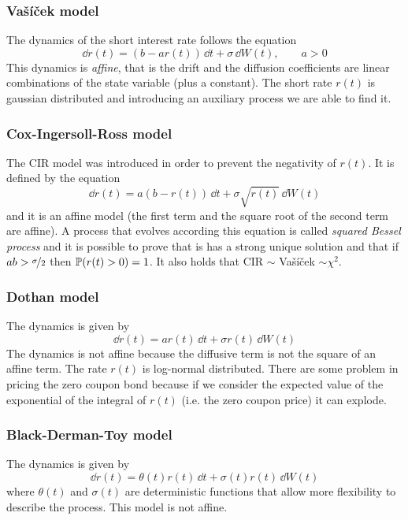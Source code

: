 \subsubsection{Vašíček model}
The dynamics of the short interest rate follows the equation
\begin{equation}
    \dd r(t) = (b-ar(t))\,\dd t + \sigma\,\dd W(t), \qquad a>0
\end{equation}
This dynamics is \emph{affine}, that is the drift and the diffusion coefficients are linear combinations of the state variable (plus a constant). The short rate $r(t)$ is gaussian distributed and introducing an auxiliary process we are able to find it.

\subsubsection{Cox-Ingersoll-Ross model}
The CIR model was introduced in order to prevent the negativity of $r(t)$. It is defined by the equation
\begin{equation}
    \dd r(t) = a(b-r(t))\,\dd t + \sigma\sqrt{r(t)}\,\dd W(t)
\end{equation}
and it is an affine model (the first term and the square root of the second term are affine). A process that evolves according this equation is called \emph{squared Bessel process} and it is possible to prove that is has a strong unique solution and that if $ab>\nicefrac{\sigma}{2}$ then $\mathbb{P}(r(t)>0)=1$. It also holds that CIR $\sim$ Vašíček $\sim \chi^2$.

\subsubsection{Dothan model}
The dynamics is given by
\begin{equation}
    \dd r(t) = ar(t)\,\dd t + \sigma r(t)\,\dd W(t)
\end{equation}
The dynamics is not affine because the diffusive term is not the square of an affine term. The rate $r(t)$ is log-normal distributed. There are some problem in pricing the zero coupon bond because if we consider the expected value of the exponential of the integral of $r(t)$ (i.e. the zero coupon price) it can explode.

\subsubsection{Black-Derman-Toy model}
The dynamics is given by
\begin{equation}
    \dd r(t) = \theta(t)r(t)\,\dd t + \sigma(t)r(t)\,\dd W(t)
\end{equation}
where $\theta(t)$ and $\sigma(t)$ are deterministic functions that allow more flexibility to describe the process. This model is not affine.

